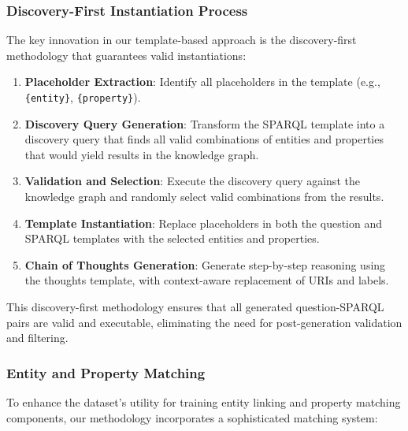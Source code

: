 \subsubsection{Discovery-First Instantiation Process}
The key innovation in our template-based approach is the discovery-first methodology that guarantees valid instantiations:

\begin{enumerate}
    \item \textbf{Placeholder Extraction}: Identify all placeholders in the template (e.g., \texttt{\{entity\}}, \texttt{\{property\}}).
    
    \item \textbf{Discovery Query Generation}: Transform the SPARQL template into a discovery query that finds all valid combinations of entities and properties that would yield results in the knowledge graph.
    
    \item \textbf{Validation and Selection}: Execute the discovery query against the knowledge graph and randomly select valid combinations from the results.
    
    \item \textbf{Template Instantiation}: Replace placeholders in both the question and SPARQL templates with the selected entities and properties.
    
    \item \textbf{Chain of Thoughts Generation}: Generate step-by-step reasoning using the thoughts template, with context-aware replacement of URIs and labels.
\end{enumerate}

This discovery-first methodology ensures that all generated question-SPARQL pairs are valid and executable, eliminating the need for post-generation validation and filtering.

\subsubsection{Entity and Property Matching}
To enhance the dataset's utility for training entity linking and property matching components, our methodology incorporates a sophisticated matching system:


